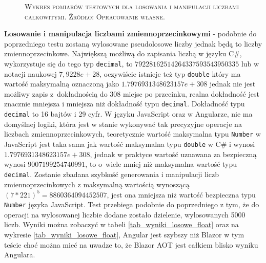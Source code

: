 \documentclass[12pt,a4paper,oneside]{book}
\newcommand{\captionT}[1]{\caption{\textsc{\footnotesize{#1}}}}
\begin{document}
\begin{figure}[!htp]
\centering
{}
\captionT{Wykres pomiarów testowych dla losowania i manipulacji liczbami całkowitymi. Źródło: Opracowanie własne.}
\label{wykres_wyniki_losowe_int}
\end{figure}

\textbf{Losowanie i manipulacja liczbami zmiennoprzecinkowymi} - podobnie do poprzedniego testu zostaną wylosowane pseudolosowe liczby jednak będą to liczby zmiennoprzecinkowe. Największą możliwą do zapisania liczbą w języku C\#, wykorzystuje się do tego typ \texttt{decimal}, to $79228162514264337593543950335$ lub w notacji naukowej $7,9228e+28$, oczywiście istnieje też typ \texttt{double} który ma wartość maksymalną oznaczoną jako $1.7976931348623157e+308$ jednak nie jest możliwy zapis z~dokładnością do 308 miejsc po przecinku, realna dokładność jest znacznie mniejsza i mniejsza niż dokładność typu \texttt{decimal}. Dokładność typu \texttt{decimal} to 16 bajtów i 29 cyfr. W języku JavaScript oraz w Angularze, nie ma domyślnej logiki, która jest w stanie wykonywać tak precyzyjne operacje na liczbach zmiennoprzecinkowych, teoretycznie wartość maksymalna typu \texttt{Number} w JavaScript jest taka sama jak wartość maksymalna typu \texttt{double} w C\# i wynosi $1.7976931348623157e+308$, jednak w praktyce wartość uznawana za bezpieczną wynosi $9007199254740991$, to o~wiele mniej niż maksymalna wartość typu \texttt{decimal}. Zostanie zbadana szybkość generowania i manipulacji liczb zmiennoprzecinkowych z maksymalną wartością wynoszącą $(7 * 221)^5 = 8860364094452507$, jest ona mniejsza niż wartość bezpieczna typu \texttt{Number} języka JavaScript. Test przebiega podobnie do poprzedniego z tym, że do operacji na wylosowanej liczbie dodane zostało dzielenie, wylosowanych 5000 liczb. Wyniki można zobaczyć w tabeli \ref{tab_wyniki_losowe_float} oraz na wykresie \ref{tab_wyniki_losowe_float}, Angular jest szybszy niż Blazor w tym teście choć można mieć na uwadze to, że Blazor AOT jest całkiem blisko wyniku Angulara.
\end{document}
